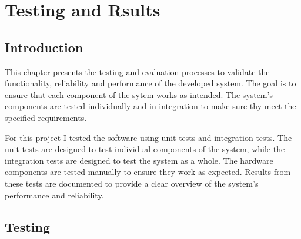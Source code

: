 \chapter{Testing and Rsults}
\section{Introduction}
This chapter presents the testing and evaluation processes to validate the functionality, reliability and performance of the developed system.
The goal is to ensure that each component of the sytem works as intended. The system's components are tested individually and in integration to 
make sure thy meet the specified requirements.

For this project I tested the software using unit tests and integration tests. 
The unit tests are designed to test individual components of the system, while the integration tests are designed to test the system as a whole.
The hardware components are tested manually to ensure they work as expected. Results from these tests are documented to provide a clear 
overview of the system's performance and reliability.

\section{Testing}
